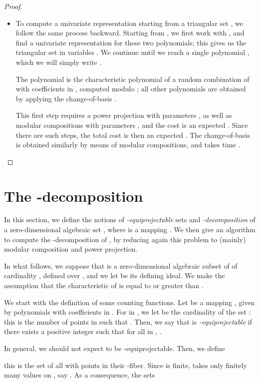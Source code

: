 \documentclass[12pt]{article}
\begin{document}
\begin{proof}
\begin{itemize}
  \item To compute a univariate representation starting from a
    triangular set , we follow the same process
    backward. Starting from ,
    we first work with , and find a univariate
    representation for these two polynomials; this gives us the
    triangular set in  variables
    . We continue until we reach
    a single polynomial , which we will simply write .

    The polynomial  is the characteristic polynomial of a
    random combination of  with coefficients in
    , computed modulo ; all other polynomials  are
    obtained by applying the change-of-basis .

    This first step requires a power projection with parameters
    , as well as modular compositions with parameters ,
    and the cost is an expected . Since there are 
    such steps, the total cost is then an expected
    . The change-of-basis  is obtained similarly by means of modular compositions,
    and takes time .
  \end{itemize}
\end{proof}



\section{The -decomposition}\label{sec:CtoE}

In this section, we define the notions of {\em -equiprojectable}
sets and {\em -decomposition} of a zero-dimensional algebraic
set , where  is a mapping . We then give an algorithm to compute the
-decomposition of , by reducing again this problem to
(mainly) modular composition and power projection.

In what follows, we suppose that  is a zero-dimensional algebraic
subset of  of cardinality , defined over , and we
let  be its defining ideal. We
make the assumption that the characteristic of  is equal to  or
greater than .

We start with the definition of some counting functions. Let  be
a mapping , given by polynomials with coefficients
in . For  in , we let  be the cardinality of
the set : this is the number of
points  in  such that . Then, we say that
 is {\em -equiprojectable} if there exists a positive integer
 such that for all  in , .

In general, we should not expect  to be -equiprojectable.
Then, we define

this is the set of all  with  points in their
-fiber. Since  is finite,  takes only
finitely many values on , say .  As a
consequence, the sets
\end{document}
